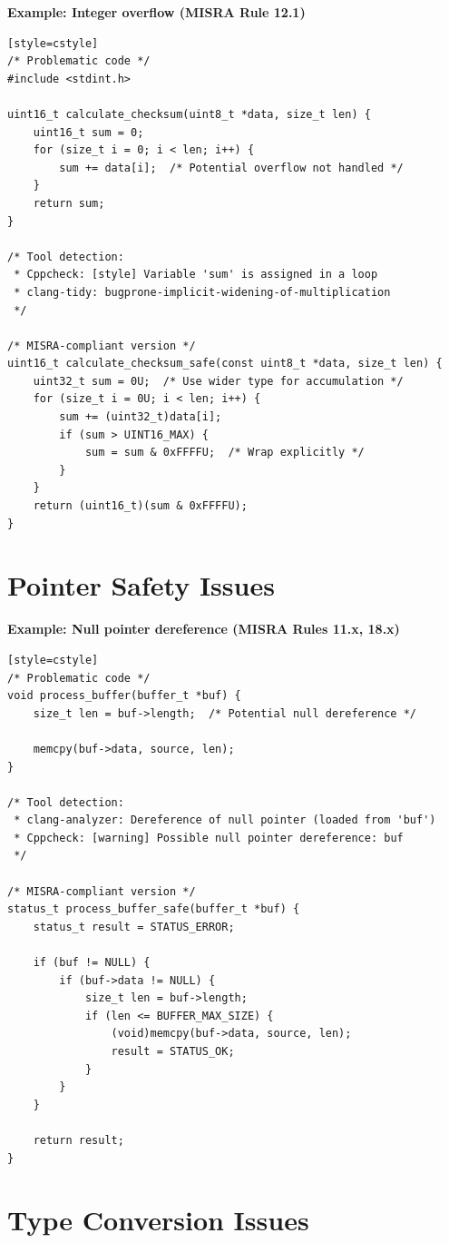 \documentclass[11pt,letterpaper]{report}
\begin{document}
\textbf{Example: Integer overflow (MISRA Rule 12.1)}

\begin{verbatim}[style=cstyle]
/* Problematic code */
#include <stdint.h>

uint16_t calculate_checksum(uint8_t *data, size_t len) {
    uint16_t sum = 0;
    for (size_t i = 0; i < len; i++) {
        sum += data[i];  /* Potential overflow not handled */
    }
    return sum;
}

/* Tool detection:
 * Cppcheck: [style] Variable 'sum' is assigned in a loop
 * clang-tidy: bugprone-implicit-widening-of-multiplication
 */

/* MISRA-compliant version */
uint16_t calculate_checksum_safe(const uint8_t *data, size_t len) {
    uint32_t sum = 0U;  /* Use wider type for accumulation */
    for (size_t i = 0U; i < len; i++) {
        sum += (uint32_t)data[i];
        if (sum > UINT16_MAX) {
            sum = sum & 0xFFFFU;  /* Wrap explicitly */
        }
    }
    return (uint16_t)(sum & 0xFFFFU);
}
\end{verbatim}

\section{Pointer Safety Issues}

\textbf{Example: Null pointer dereference (MISRA Rules 11.x, 18.x)}

\begin{verbatim}[style=cstyle]
/* Problematic code */
void process_buffer(buffer_t *buf) {
    size_t len = buf->length;  /* Potential null dereference */

    memcpy(buf->data, source, len);
}

/* Tool detection:
 * clang-analyzer: Dereference of null pointer (loaded from 'buf')
 * Cppcheck: [warning] Possible null pointer dereference: buf
 */

/* MISRA-compliant version */
status_t process_buffer_safe(buffer_t *buf) {
    status_t result = STATUS_ERROR;

    if (buf != NULL) {
        if (buf->data != NULL) {
            size_t len = buf->length;
            if (len <= BUFFER_MAX_SIZE) {
                (void)memcpy(buf->data, source, len);
                result = STATUS_OK;
            }
        }
    }

    return result;
}
\end{verbatim}

\section{Type Conversion Issues}
\end{document}
